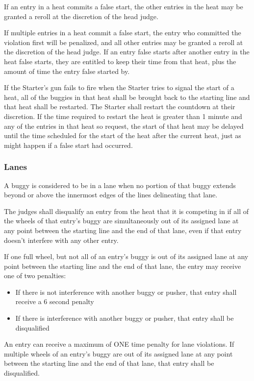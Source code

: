     If an entry in a heat commits a false start, the other entries in the heat may be granted a reroll at the discretion of the head judge.

    If multiple entries in a heat commit a false start, the entry who committed the violation first will be penalized, and all other entries may be granted a reroll at the discretion of the head judge. If an entry false starts after another entry in the heat false starts, they are entitled to keep their time from that heat, plus the amount of time the entry false started by.

	If the Starter's gun fails to fire when the Starter tries to signal the start of a heat, all of the buggies in that heat shall be brought back to the starting line and that heat shall be restarted. The Starter shall restart the countdown at their discretion. If the time required to restart the heat is greater than 1 minute and any of the entries in that heat so request, the start of that heat may be delayed until the time scheduled for the start of the heat after the current heat, just as might happen if a false start had occurred.

\subsubsection{Lanes}

	A buggy is considered to be in a lane when no portion of that buggy extends beyond or above the innermost edges of the lines delineating that lane.

	The judges shall disqualify an entry from the heat that it is competing in if all of the wheels of that entry's buggy are simultaneously out of its assigned lane at any point between the starting line and the end of that lane, even if that entry doesn't interfere with any other entry.

	If one full wheel, but not all of an entry’s buggy is out of its assigned lane at any point between the starting line and the end of that lane, the entry may receive one of two penalties:
    \begin{itemize}
    \item If there is not interference with another buggy or pusher, that entry shall receive a 6 second penalty
    \item If there is interference with another buggy or pusher, that entry shall be disqualified
    \end{itemize}
    An entry can receive a maximum of ONE time penalty for lane violations.
    If multiple wheels of an entry’s buggy are out of its assigned lane at any point between the starting line and the end of that lane, that entry shall be disqualified.

